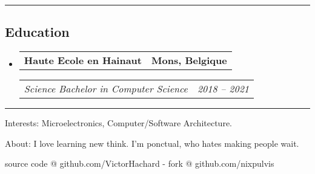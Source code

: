 \documentclass[10pt,letterpaper]{article}
\makeatletter
\newenvironment{indentsection}[1]
{\begin{list}{}
  {\setlength{\leftmargin}{#1}} \item[]
}
{\end{list}}
\newcommand{\headerrow}[2]
{\begin{tabular*}{\linewidth}{l@{\extracolsep{\fill}}r}
  #1 &
  #2 \\
\end{tabular*}}
\makeatother
\begin{document}
\hrule
\vspace{-0.4em}
\subsection*{Education}
\begin{itemize}
  \parskip=0.1em

  \item
  \headerrow
    {\textbf{Haute Ecole en Hainaut}}
    {\textbf{Mons, Belgique}}
  \headerrow
    {\emph{Science Bachelor in Computer Science}}
    {\emph{2018 -- 2021}}
\end{itemize}




\hrule
\begin{indentsection}{\parindent}
\begin{description*}
\item[Interests:]
  Microelectronics, Computer/Software Architecture.
\item[About:]
  I love learning new think. I’m ponctual, who hates making people wait.
\end{description*}
\end{indentsection}


\begin{center}
\footnotesize source code @ github.com/VictorHachard - fork @ github.com/nixpulvis
\end{center}
\end{document}
